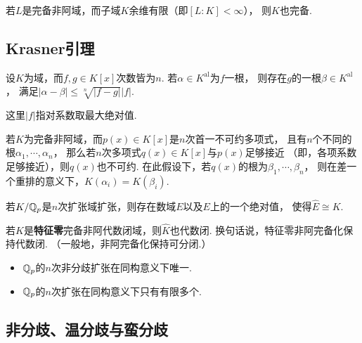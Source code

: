 \begin{exercise}
    若$L$是完备非阿域，而子域$K$余维有限（即$[L:K] < \infty$），
    则$K$也完备.
\end{exercise}

\subsection{Krasner引理}
\begin{exercise}[根与系数的连续性]
    设$K$为域，而$f,g \in K[x]$次数皆为$n$.
    若$\alpha \in K^{\mathrm{al}}$为$f$一根，
    则存在$g$的一根$\beta \in K^{\mathrm{al}}$，
    满足$|\alpha - \beta| \leq \sqrt[n]{|f-g|}|f|$. 
    
    这里$|f|$指对系数取最大绝对值.
\end{exercise}

\begin{exercise}
    若$K$为完备非阿域，而$p(x) \in K[x]$是$n$次首一不可约多项式，
    且有$n$个不同的根$\alpha_{1},\cdots,\alpha_{n}$，
    那么若$n$次多项式$q(x) \in K[x]$与$p(x)$足够接近
    （即，各项系数足够接近），则$q(x)$也不可约.
    在此假设下，若$q(x)$的根为$\beta_{1},\cdots,\beta_{n}$，
    则在差一个重排的意义下，$K(\alpha_{i}) = K(\beta_{i})$.
\end{exercise}

\begin{exercise}
    若$K/\mathbb{Q}_{p}$是$n$次扩张域扩张，则存在数域$E$以及$E$上的一个绝对值，
    使得$\hat{E} \cong K$.
\end{exercise}

\begin{exercise}
    若$K$是\textbf{特征零}完备非阿代数闭域，则$\hat{K}$也代数闭.
    换句话说，特征零非阿完备化保持代数闭. （一般地，非阿完备化保持可分闭.）
\end{exercise}

\begin{exercise}
    \begin{itemize}
        \item[(1)]
        $\mathbb{Q}_{p}$的$n$次非分歧扩张在同构意义下唯一.

        \item[(2)]
        $\mathbb{Q}_{p}$的$n$次扩张在同构意义下只有有限多个.
    \end{itemize}
\end{exercise}

\subsection{非分歧、温分歧与蛮分歧}

